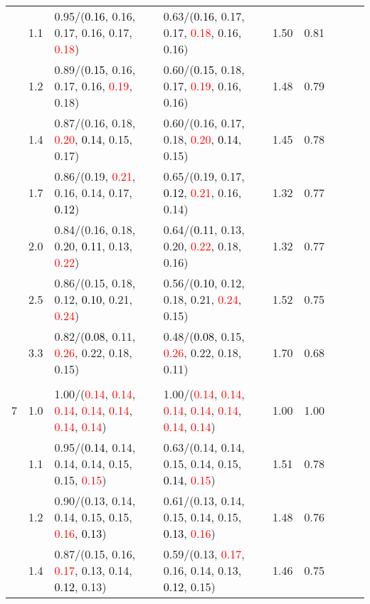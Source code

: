 \documentclass[10pt,a4paper]{report}
\begin{document}
\begin{table}[!htbp]
\begin{center}
{\begin{tabular}{ccllccccc}
			&1.1&0.95/(\textcolor{black}{0.16}, 0.16, 0.17, 0.16, 0.17, \textcolor{red}{0.18})&0.63/(\textcolor{black}{0.16}, 0.17, 0.17, \textcolor{red}{0.18}, 0.16, 0.16)&1.50&0.81\\
			&1.2&0.89/(\textcolor{black}{0.15}, 0.16, 0.17, 0.16, \textcolor{red}{0.19}, 0.18)&0.60/(\textcolor{black}{0.15}, 0.18, 0.17, \textcolor{red}{0.19}, 0.16, 0.16)&1.48&0.79\\
			&1.4&0.87/(0.16, 0.18, \textcolor{red}{0.20}, \textcolor{black}{0.14}, 0.15, 0.17)&0.60/(0.16, 0.17, 0.18, \textcolor{red}{0.20}, \textcolor{black}{0.14}, 0.15)&1.45&0.78\\
			&1.7&0.86/(0.19, \textcolor{red}{0.21}, 0.16, 0.14, 0.17, \textcolor{black}{0.12})&0.65/(0.19, 0.17, \textcolor{black}{0.12}, \textcolor{red}{0.21}, 0.16, 0.14)&1.32&0.77\\
			&2.0&0.84/(0.16, 0.18, 0.20, \textcolor{black}{0.11}, 0.13, \textcolor{red}{0.22})&0.64/(\textcolor{black}{0.11}, 0.13, 0.20, \textcolor{red}{0.22}, 0.18, 0.16)&1.32&0.77\\
			&2.5&0.86/(0.15, 0.18, 0.12, \textcolor{black}{0.10}, 0.21, \textcolor{red}{0.24})&0.56/(\textcolor{black}{0.10}, 0.12, 0.18, 0.21, \textcolor{red}{0.24}, 0.15)&1.52&0.75\\
			&3.3&0.82/(\textcolor{black}{0.08}, 0.11, \textcolor{red}{0.26}, 0.22, 0.18, 0.15)&0.48/(\textcolor{black}{0.08}, 0.15, \textcolor{red}{0.26}, 0.22, 0.18, 0.11)&1.70&0.68\\
			&&&&\\
			7			&1.0&1.00/(\textcolor{red}{0.14}, \textcolor{red}{0.14}, \textcolor{red}{0.14}, \textcolor{red}{0.14}, \textcolor{red}{0.14}, \textcolor{red}{0.14}, \textcolor{red}{0.14})&1.00/(\textcolor{red}{0.14}, \textcolor{red}{0.14}, \textcolor{red}{0.14}, \textcolor{red}{0.14}, \textcolor{red}{0.14}, \textcolor{red}{0.14}, \textcolor{red}{0.14})&1.00&1.00\\
			&1.1&0.95/(\textcolor{black}{0.14}, 0.14, 0.14, 0.14, 0.15, 0.15, \textcolor{red}{0.15})&0.63/(0.14, 0.14, 0.15, 0.14, 0.15, \textcolor{black}{0.14}, \textcolor{red}{0.15})&1.51&0.78\\
			&1.2&0.90/(0.13, 0.14, 0.14, 0.15, 0.15, \textcolor{red}{0.16}, \textcolor{black}{0.13})&0.61/(0.13, 0.14, 0.15, 0.14, 0.15, \textcolor{black}{0.13}, \textcolor{red}{0.16})&1.48&0.76\\
			&1.4&0.87/(0.15, 0.16, \textcolor{red}{0.17}, 0.13, 0.14, \textcolor{black}{0.12}, 0.13)&0.59/(0.13, \textcolor{red}{0.17}, 0.16, 0.14, 0.13, \textcolor{black}{0.12}, 0.15)&1.46&0.75\\

\end{tabular}}
\end{center}
\end{table}
\end{document}
